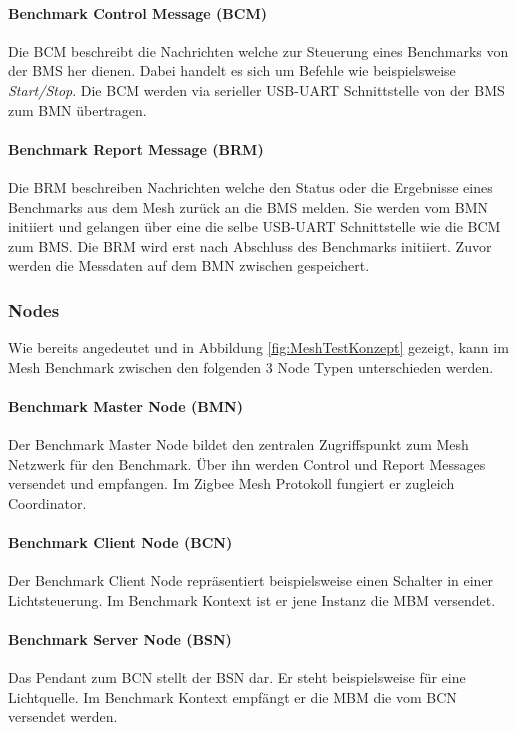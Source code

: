 \paragraph{Benchmark Control Message (BCM)}
Die BCM beschreibt die Nachrichten welche zur Steuerung eines Benchmarks von der BMS her dienen. Dabei handelt es sich um Befehle wie beispielsweise \textit{Start/Stop}. Die BCM werden via serieller USB-UART Schnittstelle von der BMS zum BMN übertragen.

\paragraph{Benchmark Report Message (BRM)}
Die BRM beschreiben Nachrichten welche den Status oder die Ergebnisse eines Benchmarks aus dem Mesh zurück an die BMS melden. Sie werden vom BMN initiiert und gelangen über eine die selbe USB-UART Schnittstelle wie die BCM zum BMS. Die BRM wird erst nach Abschluss des Benchmarks initiiert. Zuvor werden die Messdaten auf dem BMN zwischen gespeichert.


\subsubsection{Nodes}\label{subsubsec:Nodes}
Wie bereits angedeutet und in Abbildung \ref{fig:MeshTestKonzept} gezeigt, kann im Mesh Benchmark zwischen den folgenden 3 Node Typen unterschieden werden.

\paragraph{Benchmark Master Node (BMN)}
Der Benchmark Master Node bildet den zentralen Zugriffspunkt zum Mesh Netzwerk für den Benchmark. Über ihn werden Control und Report Messages versendet und empfangen. Im Zigbee Mesh Protokoll fungiert er zugleich Coordinator.


\paragraph{Benchmark Client Node (BCN)}
Der Benchmark Client Node repräsentiert beispielsweise einen Schalter in einer Lichtsteuerung. Im Benchmark Kontext ist er jene Instanz die MBM versendet.

\paragraph{Benchmark Server Node (BSN)}
Das Pendant zum BCN stellt der BSN dar. Er steht beispielsweise für eine Lichtquelle. Im Benchmark Kontext empfängt er die MBM die vom BCN versendet werden.


